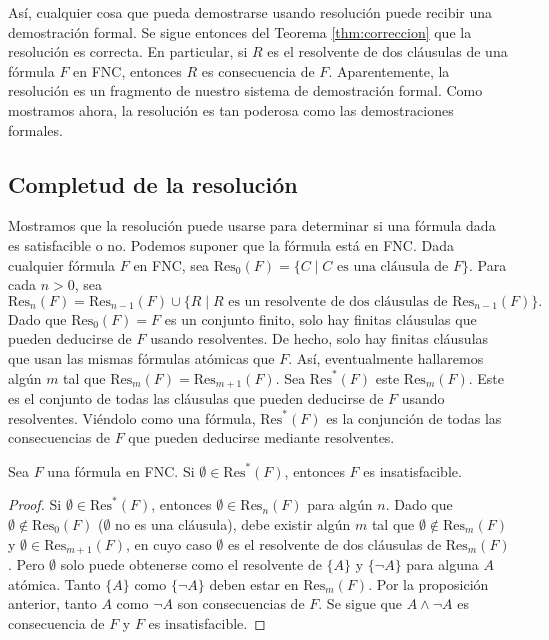 \documentclass[12pt,a4paper]{book}
\begin{document}
    Así, cualquier cosa que pueda demostrarse usando resolución puede recibir una demostración formal. Se sigue entonces del
    Teorema \ref{thm:correccion} que la resolución es correcta. En particular, si $R$ es el resolvente de dos cláusulas de
    una fórmula $F$ en FNC, entonces $R$ es consecuencia de $F$. Aparentemente, la resolución es un fragmento de nuestro
    sistema de demostración formal. Como mostramos ahora, la resolución es tan poderosa como las demostraciones formales.

    \subsection{Completud de la resolución}

    Mostramos que la resolución puede usarse para determinar si una fórmula dada es satisfacible o no. Podemos suponer que
    la fórmula está en FNC. Dada cualquier fórmula $F$ en FNC, sea $\mathrm{Res}_{0}(F)=\{C\mid C\text{ es una cláusula de }F\}$.
    Para cada $n>0$, sea
    \begin{equation*}
        \mathrm{Res}_{n}(F)=\mathrm{Res}_{n-1}(F)\cup\{R\mid R\text{ es un resolvente de dos cláusulas de }\mathrm{Res}_{n-1}(F)\}.
    \end{equation*}
    Dado que $\mathrm{Res}_{0}(F)=F$ es un conjunto finito, solo hay finitas cláusulas que pueden deducirse de $F$ usando
    resolventes. De hecho, solo hay finitas cláusulas que usan las mismas fórmulas atómicas que $F$. Así, eventualmente
    hallaremos algún $m$ tal que $\mathrm{Res}_{m}(F)=\mathrm{Res}_{m+1}(F)$. Sea $\mathrm{Res}^{*}(F)$ este $\mathrm{Res}_{m}(F)$.
    Este es el conjunto de todas las cláusulas que pueden deducirse de $F$ usando resolventes. Viéndolo como una fórmula,
    $\mathrm{Res}^{*}(F)$ es la conjunción de todas las consecuencias de $F$ que pueden deducirse mediante resolventes.

    \begin{proposicion}\label{prop:vacio-implica-insatisfacible}
        Sea $F$ una fórmula en FNC. Si $\emptyset\in\mathrm{Res}^{*}(F)$, entonces $F$ es insatisfacible.
    \end{proposicion}
    \begin{proof}
        Si $\emptyset\in\mathrm{Res}^{*}(F)$, entonces $\emptyset\in\mathrm{Res}_{n}(F)$ para algún $n$. Dado que
        $\emptyset\notin\mathrm{Res}_{0}(F)$ ($\emptyset$ no es una cláusula), debe existir algún $m$ tal que
        $\emptyset\notin\mathrm{Res}_{m}(F)$ y $\emptyset\in\mathrm{Res}_{m+1}(F)$, en cuyo caso $\emptyset$ es el resolvente
        de dos cláusulas de $\mathrm{Res}_{m}(F)$. Pero $\emptyset$ solo puede obtenerse como el resolvente de $\{A\}$ y
        $\{\neg A\}$ para alguna $A$ atómica. Tanto $\{A\}$ como $\{\neg A\}$ deben estar en $\mathrm{Res}_{m}(F)$. Por la
        proposición anterior, tanto $A$ como $\neg A$ son consecuencias de $F$. Se sigue que $A\wedge\neg A$ es consecuencia
        de $F$ y $F$ es insatisfacible.
    \end{proof}
\end{document}
